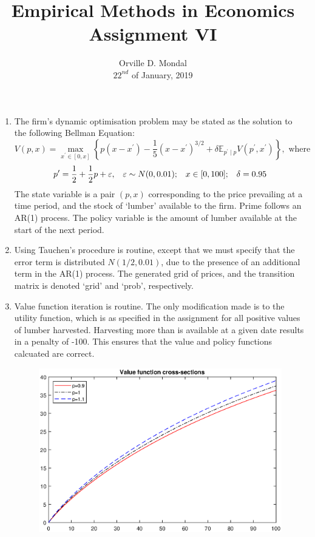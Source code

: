 \documentclass[12pt,a4paper]{article}
\title{Empirical Methods in Economics\\\small{Assignment VI}\vspace{-9ex}}
\date{Orville D. Mondal\\ $22^{nd}$ of January, 2019\vspace{-3ex}}
\newcommand{\E}{\mathbb{E}}
\begin{document}
\maketitle
\begin{enumerate}[1.]
\item The firm's dynamic optimisation problem may be stated as the solution to the following Bellman Equation:
\[V(p,x)=\max_{x^\prime\in[0,x]}\left\{p(x-x^\prime)-\frac{1}{5}(x-x^\prime)^{3/2}+\delta\E_{p^\prime\mid p}V(p^\prime,x^\prime)\right\},\text{ where }\]
\[p^\prime=\frac{1}{2}+\frac{1}{2}p+\varepsilon,\hspace{3mm}\varepsilon\sim N(0,0.01);\hspace{3mm} x\in [0,100]; \hspace{3mm} \delta=0.95\]
The state variable is a pair $(p,x)$ corresponding to the price prevailing at a time period, and the stock of `lumber' available to the firm. Prime follows an AR(1) process. The policy variable is the amount of lumber available at the start of the next period. 
\item Using Tauchen's procedure is routine, except that we must specify that the error term is distributed $N(1/2,0.01)$, due to the presence of an additional term in the AR(1) process. The generated grid of prices, and the transition matrix is denoted `grid' and `prob', respectively. 
\item Value function iteration is routine. The only modification made is to the utility function, which is as specified in the assignment for all positive values of lumber harvested. Harvesting more than is available at a given date results in a penalty of -100. This ensures that the value and policy functions calcuated are correct.  
\begin{figure}[h]
\includegraphics[width=\textwidth]{value.eps}\vspace{-3ex}

\end{figure}
\end{enumerate}
\end{document}
